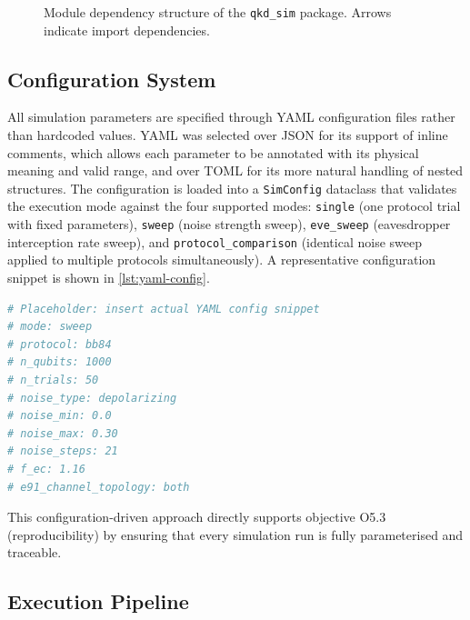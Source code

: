 \documentclass[10pt, a4paper]{report}
\begin{document}
\begin{figure}[ht]
    \centering
    \caption{Module dependency structure of the \texttt{qkd\_sim} package. Arrows indicate import dependencies.}
    \label{fig:architecture}
\end{figure}

\subsection{Configuration System}

All simulation parameters are specified through YAML configuration files rather than hardcoded values. YAML was selected over JSON for its support of inline comments, which allows each parameter to be annotated with its physical meaning and valid range, and over TOML for its more natural handling of nested structures. The configuration is loaded into a \texttt{SimConfig} dataclass that validates the execution mode against the four supported modes: \texttt{single} (one protocol trial with fixed parameters), \texttt{sweep} (noise strength sweep), \texttt{eve\_sweep} (eavesdropper interception rate sweep), and \texttt{protocol\_comparison} (identical noise sweep applied to multiple protocols simultaneously). A representative configuration snippet is shown in \cref{lst:yaml-config}.

\begin{lstlisting}[language=Python, caption={Example YAML configuration for a BB84 noise sweep}, label={lst:yaml-config}]
# Placeholder: insert actual YAML config snippet
# mode: sweep
# protocol: bb84
# n_qubits: 1000
# n_trials: 50
# noise_type: depolarizing
# noise_min: 0.0
# noise_max: 0.30
# noise_steps: 21
# f_ec: 1.16
# e91_channel_topology: both
\end{lstlisting}

This configuration-driven approach directly supports objective O5.3 (reproducibility) by ensuring that every simulation run is fully parameterised and traceable.

\subsection{Execution Pipeline}
\end{document}
